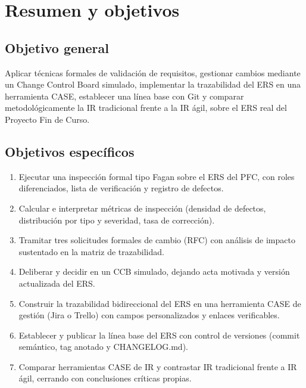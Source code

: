 \documentclass[11pt,a4paper]{article}
\begin{document}
\tableofcontents
\newpage

\listoftables
{}
\newpage

\listoffigures
{}
\newpage

\section{Resumen y objetivos}

\subsection*{Objetivo general}
Aplicar técnicas formales de validación de requisitos, gestionar cambios mediante un
Change Control Board simulado, implementar la trazabilidad del ERS en una herramienta CASE, establecer
una línea base con Git y comparar metodológicamente la IR tradicional frente a la IR ágil, sobre el ERS
real del Proyecto Fin de Curso.

\subsection*{Objetivos específicos}
\begin{enumerate} 
\item Ejecutar una inspección formal tipo Fagan sobre el ERS del PFC, con roles diferenciados, lista de
verificación y registro de defectos.

\item Calcular e interpretar métricas de inspección (densidad de defectos, distribución por tipo y severidad,
tasa de corrección).
\item Tramitar tres solicitudes formales de cambio (RFC) con análisis de impacto sustentado en la matriz de
trazabilidad.
\item Deliberar y decidir en un CCB simulado, dejando acta motivada y versión actualizada del ERS.
\item Construir la trazabilidad bidireccional del ERS en una herramienta CASE de gestión (Jira o Trello)
con campos personalizados y enlaces verificables.
\item Establecer y publicar la línea base del ERS con control de versiones (commit semántico, tag anotado y
CHANGELOG.md).
\item Comparar herramientas CASE de IR y contrastar IR tradicional frente a IR ágil, cerrando con conclusiones críticas propias.
\end{enumerate}
\end{document}
